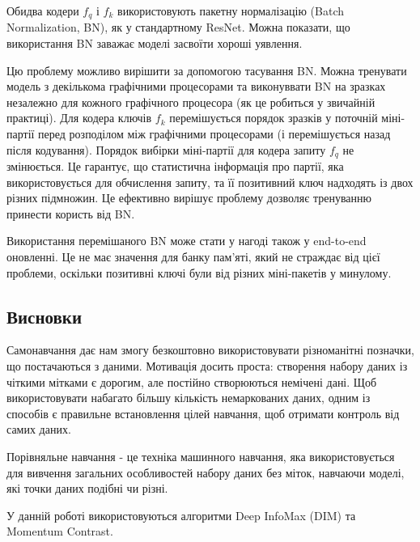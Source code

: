Обидва кодери $f_{q}$ і $f_{k}$ використовують пакетну нормалізацію (Batch Normalization, BN), як у стандартному ResNet. Можна показати, що використання BN заважає моделі засвоїти хороші уявлення.

Цю проблему можливо вирішити за допомогою тасування BN. Можна тренувати модель з декількома графічними процесорами та виконуввати BN на зразках незалежно для кожного графічного процесора (як це робиться у звичайній практиці). Для кодера ключів $f_{k}$ перемішується порядок зразків у поточній міні-партії перед розподілом між графічними процесорами (і перемішується назад після кодування). Порядок вибірки міні-партії для кодера запиту $f_{q}$ не змінюється. Це гарантує, що статистична інформація про партії, яка використовується для обчислення запиту, та її позитивний ключ надходять із двох різних підмножин. Це ефективно вирішує проблему дозволяє тренуванню принести користь від BN.

Використання перемішаного BN може стати у нагоді також у end-to-end оновленні. Це не має значення для банку пам'яті, який не страждає від цієї проблеми, оскільки позитивні ключі були від різних міні-пакетів у минулому.

\subsection{Висновки}

Самонавчання дає нам змогу безкоштовно використовувати різноманітні позначки, що постачаються з даними. Мотивація досить проста: створення набору даних із чіткими мітками є дорогим, але постійно створюються немічені дані. Щоб використовувати набагато більшу кількість немаркованих даних, одним із способів є правильне встановлення цілей навчання, щоб отримати контроль від самих даних.

Порівняльне навчання - це техніка машинного навчання, яка використовується для вивчення загальних особливостей набору даних без міток, навчаючи моделі, які точки даних подібні чи різні.

У данній роботі використовуються алгоритми Deep InfoMax (DIM) та Momentum Contrast.
